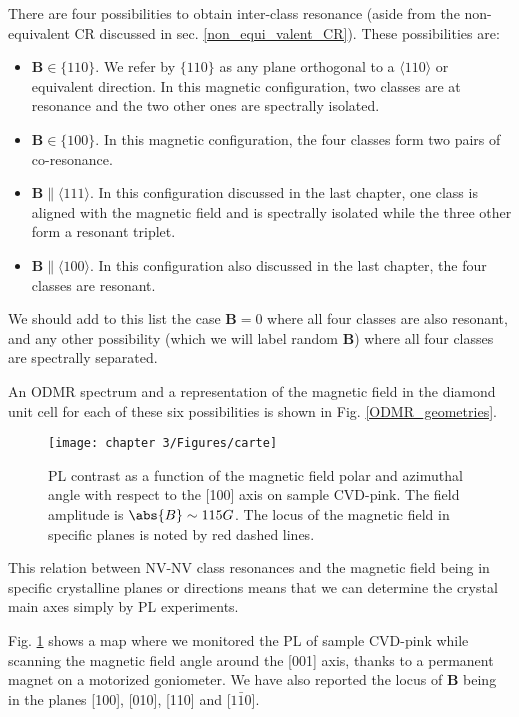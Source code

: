 \documentclass[a4paper, 11pt]{book}
\begin{document}
There are four possibilities to obtain inter-class resonance (aside from the non-equivalent CR discussed in sec. \ref{non_equi_valent_CR}). These possibilities are:
\begin{itemize}
\item $\mathbf{B} \in \{110\}$. We refer by $\{110\}$ as any plane orthogonal to a $\langle 110 \rangle$ or equivalent direction. In this magnetic configuration, two classes are at resonance and the two other ones are spectrally isolated.
\item $\mathbf{B} \in \{100\}$. In this magnetic configuration, the four classes form two pairs of co-resonance.
\item $\mathbf{B} \parallel \langle 111 \rangle$. In this configuration discussed in the last chapter, one class is aligned with the magnetic field and is spectrally isolated while the three other form a resonant triplet.
\item $\mathbf{B} \parallel \langle 100 \rangle$. In this configuration also discussed in the last chapter, the four classes are resonant.
\end{itemize}
We should add to this list the case $\mathbf{B}=0$ where all four classes are also resonant, and any other possibility (which we will label random $\mathbf{B}$) where all four classes are spectrally separated. 

An ODMR spectrum and a representation of the magnetic field in the diamond unit cell for each of these six possibilities is shown in Fig. \ref{ODMR_geometries}.

\begin{figure}[h]
\centering
\texttt{[image: chapter 3/Figures/carte]}
\caption{PL contrast as a function of the magnetic field polar and azimuthal angle with respect to the [100] axis on sample CVD-pink. The field amplitude is $\abs{B} \sim 115 G$. The locus of the magnetic field in specific planes is noted by red dashed lines.}
\label{Carte}
\end{figure}

This relation between NV-NV class resonances and the magnetic field being in specific crystalline planes or directions means that we can determine the crystal main axes simply by PL experiments.

Fig. \ref{Carte} shows a map where we monitored the PL of sample CVD-pink while scanning the magnetic field angle around the [001] axis, thanks to a permanent magnet on a motorized goniometer. We have also reported the locus of $\mathbf{B}$ being in the planes [100], [010], [110] and [$1\bar 1 0$].
\end{document}
